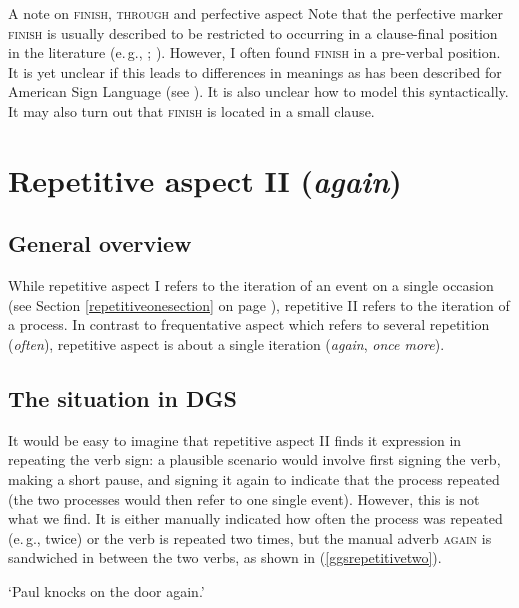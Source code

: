 \begin{digression}{{A note on \textsc{finish}, \textsc{through} and perfective aspect}}{}
\noindent Note that the perfective marker \textsc{finish} is usually described to be restricted to occurring in a clause-final position in the literature (e.\,g., \citealt[3]{pfau2004grammaticalization}; \citealt[261--262]{rathmann2005event}). However, I often found \textsc{finish} in a pre-verbal position. It is yet unclear if this leads to differences in meanings as has been described for American Sign Language (see \citealt{rathmann2005event}). It is also unclear how to model this syntactically. It may also turn out that \textsc{finish} is located in a small clause.
\end{digression}




\section{Repetitive aspect II (\textit{again})}\label{repetitivetwo}
\subsection{General overview}
While repetitive aspect I refers to the iteration of an event on a single occasion (see Section \ref{repetitiveonesection} on page \pageref{repetitiveonesection}), repetitive II refers to the iteration of a process. In contrast to frequentative aspect which refers to several repetition (\textit{often}), repetitive aspect is about a single iteration (\textit{again}, \textit{once more}). 

\subsection{The situation in DGS}
It would be easy to imagine that repetitive aspect II finds it expression in repeating the verb sign: a plausible scenario would involve first signing the verb, making a short pause, and signing it again to indicate that the process repeated (the two processes would  then refer to one single event). However, this is not what we find. It is either manually indicated how often the process was repeated (e.\,g., twice) or the verb is repeated two times, but the manual adverb \textsc{again} is sandwiched in between the two verbs, as shown in (\ref{ggsrepetitivetwo}).


\begin{exe}
\glt `Paul knocks on the door again.' \label{ggsrepetitivetwo}
\end{exe}

